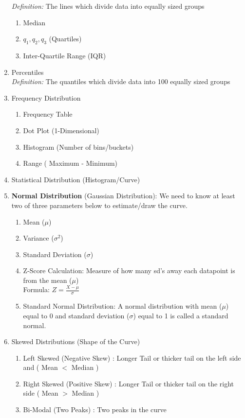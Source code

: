 \documentclass[11pt]{article}
\begin{document}
\begin{enumerate}
\textit{Definition:} The lines which divide data into equally sized groups
\begin{enumerate}
	\item Median
	\item $q_1 , q_2, q_3$ (Quartiles)
	\item Inter-Quartile Range (IQR)
\end{enumerate}
\newpage
\item Percentiles\\
\textit{Definition:} The quantiles which divide data into 100 equally sized groups
\item Frequency Distribution
\begin{enumerate}
	\item Frequency Table
	\item Dot Plot (1-Dimensional)
	\item Histogram (Number of bins/buckets)
	\item Range ( Maximum - Minimum)
\end{enumerate}
\item Statistical Distribution (Histogram/Curve)
\item \textbf{Normal Distribution} (Gaussian Distribution): We need to know at least two of three parameters below to estimate/draw the curve.
\begin{enumerate}
	\item Mean ($\mu$)
	\item Variance ($\sigma^2$)
	\item Standard Deviation ($\sigma$)
	\item Z-Score Calculation: Measure of how many sd's away each datapoint is from the mean ($ \mu $) \\
	  Formula:
	  $Z = \frac{X - \mu}{\sigma}$
	  \item Standard Normal Distribution: A normal distribution with mean ($\mu$) equal to 0 and standard deviation ($\sigma$) equal to 1 is called a standard normal.
\end{enumerate}
\item Skewed Distributions (Shape of the Curve)
\begin{enumerate}
	\item Left Skewed (Negative Skew) : Longer Tail or thicker tail on the left side and ( Mean $<$ Median )
	\item Right Skewed (Positive Skew) : Longer Tail or thicker tail on the right side ( Mean $>$ Median )
	\item Bi-Modal (Two Peaks) : Two peaks in the curve

\end{enumerate}
\end{enumerate}
\end{document}
